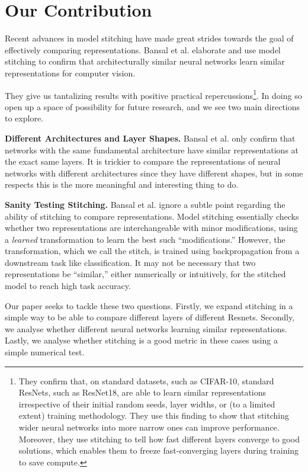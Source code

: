 \documentclass{article} %
\begin{document}
\section{Our Contribution}
\label{Contribution}
Recent advances in model stitching \cite{Bansal2021RevisitingMS} have made great strides towards the goal of effectively
comparing representations. Bansal et al. elaborate and use model stitching to confirm that architecturally similar
neural networks learn similar representations for computer vision.

They give us tantalizing results with positive practical repercussions\footnote{
   They confirm that, on standard datasets, such as CIFAR-10, standard ResNets, such as ResNet18, are able to learn similar
   representations irrespective of their initial random seeds, layer widths, or (to a limited extent) training methodology.
   They use this finding to show that stitching wider neural networks into more narrow ones can improve performance. Moreover,
   they use stitching to tell how fast different layers converge to good solutions, which enables them to freeze
   fast-converging layers during training to save compute.
}.
In doing so open up a space of possibility for future research, and we see two main directions to explore.

\textbf{Different Architectures and Layer Shapes.} Bansal et al. only confirm that networks with the same 
fundamental architecture have similar representations at
the exact same layers. It is trickier to compare the representations of neural networks with different architectures
since they have different shapes, but in some respects this is the more meaningful and interesting thing to do.

\textbf{Sanity Testing Stitching.} Bansal et al. ignore a subtle point regarding the ability 
of stitching to compare representations. Model stitching essentially checks whether two representations
are interchangeable with minor modifications, using a \textit{learned} transformation to learn the best
such ``modifications.'' However, the transformation, which we call the stitch, is trained using backpropagation
from a downstream task like classification. It may not be necessary that two representations be ``similar,'' either
numerically or intuitively, for the stitched model to reach high task accuracy.

Our paper seeks to tackle these two questions. Firstly, we expand stitching in a simple way to be able to compare
different layers of different Resnets.  Secondly, we analyse whether different neural networks learning similar
representations. Lastly, we analyse whether stitching is a good metric in these cases using a simple numerical test.
\end{document}
